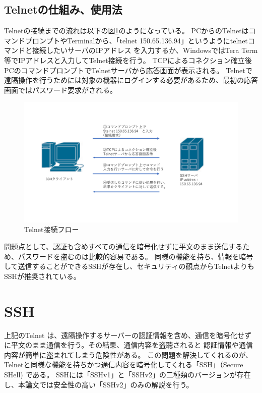 \documentclass[11pt,a4j,titlepage]{jreport}
\begin{document}
\subsection{Telnetの仕組み、使用法}
Telnetの接続までの流れは以下の図\ref{telnet_flow}のようになっている。
PCからのTelnetはコマンドプロンプトやTerminalから、「telnet 150.65.136.94」というようにtelnetコマンドと接続したいサーバのIPアドレス
を入力するか、WindowsではTera Term等でIPアドレスと入力してTelnet接続を行う。
TCPによるコネクション確立後PCのコマンドプロンプトでTelnetサーバから応答画面が表示される。
Telnetで遠隔操作を行うためには対象の機器にログインする必要があるため、最初の応答画面ではパスワード要求がされる。

\begin{figure}[H]
    \centering
    \includegraphics*[width=1.0\textwidth,page=1]{graphs/network_archtecture.pdf}
    \caption{Telnet接続フロー}
    \label{telnet_flow}
\end{figure}

問題点として、認証も含めすべての通信を暗号化せずに平文のまま送信するため、パスワードを盗むのは比較的容易である。
同様の機能を持ち、情報を暗号して送信することができるSSHが存在し、セキュリティの観点からTelnetよりもSSHが推奨されている。

\section{SSH}
上記のTelnet は、遠隔操作するサーバーの認証情報を含め、通信を暗号化せずに平文のまま通信を行う。その結果、通信内容を盗聴されると
認証情報や通信内容が簡単に盗まれてしまう危険性がある。
この問題を解決してくれるのが、Telnetと同様な機能を持ちかつ通信内容を暗号化してくれる「SSH」（Secure SHell) \cite{RFC4253}である。
SSHには「SSHv1」と「SSHv2」の二種類のバージョンが存在し、本論文では安全性の高い「SSHv2」のみの解説を行う。
\end{document}
